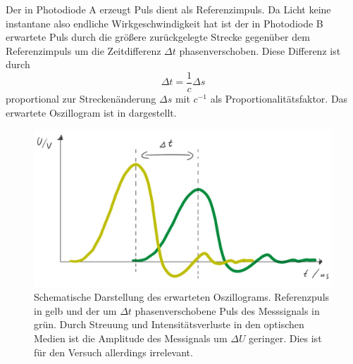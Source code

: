 %
Der in Photodiode A erzeugt Puls dient als Referenzimpuls. Da Licht keine instantane also endliche Wirkgeschwindigkeit
hat ist der in Photodiode B erwartete Puls durch die größere zurückgelegte Strecke gegenüber dem Referenzimpuls um die
Zeitdifferenz \(\Delta t\) phasenverschoben. Diese Differenz ist durch
\begin{equation}
    \Delta t = \frac{1}{c} \Delta s
\end{equation}
proportional zur Streckenänderung \(\Delta s\) mit \(c^{-1}\) als Proportionalitätsfaktor. Das erwartete Oszillogram ist
in  dargestellt.\par
\begin{figure}[h]
    \centering
    \includegraphics[width=.9\textwidth]{aufbau/signal_skizze_wht.jpg}
    \caption[Schematische Darstellung des erwarteten Oszillograms]{Schematische Darstellung des erwarteten Oszillograms.
            Referenzpuls in gelb und der um \(\Delta t\) phasenverschobene Puls des Messsignals in grün. Durch Streuung und
            Intensitätsverluste in den optischen Medien ist die Amplitude des Messignals um \(\Delta U\) geringer. Dies
            ist für den Versuch allerdings irrelevant.}
    \label{fig:puls_skizze}
\end{figure}